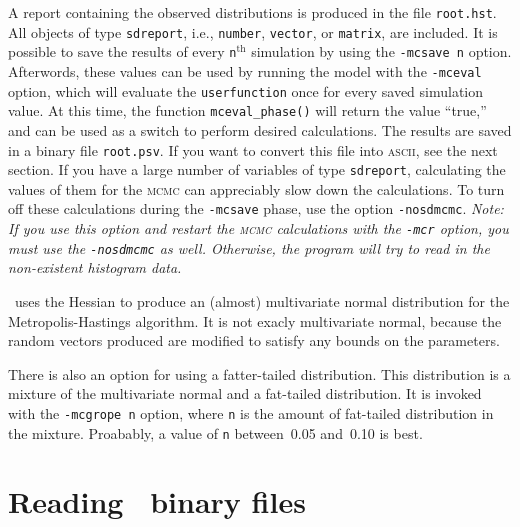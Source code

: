 \documentclass{admbmanual}
\begin{document}
A report containing the observed distributions is produced in the file
\texttt{root.hst}. All objects of type \texttt{sdreport}, i.e., \texttt{number}, 
\texttt{vector}, or \texttt{matrix}, are included. 
It is possible to save the results of every \texttt{n}$^\textrm{th}$ simulation by
using the \texttt{-mcsave n} option.  Afterwords, these values can be used by
running the model with the \texttt{-mceval} option, which will evaluate the 
\texttt{userfunction} once for every saved simulation value. At this time,
the function \texttt{mceval\_phase()} will return the value ``true,'' and can be
used as a switch to perform desired calculations. The results are saved in a
binary file \texttt{root.psv}. If you want to convert this file into
\textsc{ascii}, see the next section. If you have a large number of variables of
type \texttt{sdreport}, calculating the values of them for the \textsc{mcmc} can
appreciably slow down the calculations. To turn off these
calculations during the \texttt{-mcsave} phase, use the option
\texttt{-nosdmcmc}. {\it Note: If you use this option and restart the
\textsc{mcmc} calculations with the \texttt{-mcr} option, you must use the
\texttt{-nosdmcmc} as well. Otherwise, the program will try to read in the
non-existent histogram data.}

\ADM\  uses the Hessian to produce an (almost) multivariate normal
distribution for the Metropolis-Hastings algorithm. It is not
exacly multivariate normal, because the random vectors produced are
modified to satisfy any bounds on the parameters.

There is also an option for using a fatter-tailed distribution.
This distribution is a mixture of the multivariate normal and
a fat-tailed distribution. It is invoked with the \texttt{-mcgrope n}
option, where \texttt{n} is the amount of fat-tailed distribution in
the mixture. Proabably, a value of \texttt{n}
between~0.05 and~0.10 is best.


\section{Reading \ADM\ binary files}
\end{document}
